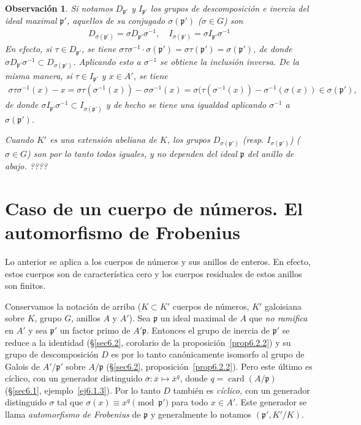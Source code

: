 \documentclass[10pt,oneside,bibtotoc,smallheadings,leqno,a5paper,DIV=12]{scrbook}
\newcommand{\idl}[1]{\mathfrak{#1}}
\newcommand{\oline}[1]{\overline{#1}}
\DeclareMathOperator{\card}{card}
\numberwithin{equation}{section}
\theoremstyle{defi}
\theoremstyle{enonce}
\theoremstyle{rem}
\newtheorem*{remark*}{Observaci\'on}
\numberwithin{theorem}{section}
\numberwithin{proposition}{section}
\numberwithin{definition}{section}
\numberwithin{lemma}{section}
\numberwithin{corollary}{section}
\numberwithin{example}{section}
\numberwithin{footnote}{section}%
\begin{document}
\begin{remark*}
Si notamos $D_{\idl{p}'}$ y $I_{\idl{p}'}$ los grupos de descomposici\'on e inercia del ideal maximal
$\idl{p}'$, aquellos de su {\em conjugado} $\sigma(\idl{p}')$ ($\sigma\in G$) son
\begin{gather}
D_{\sigma(\idl{p}')}=\sigma D_{\idl{p}'}\sigma^{-1},\quad I_{\sigma(\idl{p}')}=\sigma I_{\idl{p}'}\sigma^{-1}
\end{gather}
En efecto, si $\tau\in D_{\idl{p}'}$, se tiene $\sigma\tau\sigma^{-1}\cdot\sigma(\idl{p}')=\sigma\tau(\idl{p}')
=\sigma(\idl{p}')$, de donde $\sigma D_{\idl{p}'}\sigma^{-1}\subset D_{\sigma(\idl{p}')}$. Aplicando esto
a $\sigma^{-1}$ se obtiene la inclusi\'on inversa. De la misma manera, si $\tau\in I_{\idl{p}'}$ y $x\in A'$,
se tiene
\begin{gather*}
\sigma\tau\sigma^{-1}(x) - x = \sigma\tau(\sigma^{-1}(x))-\sigma\sigma^{-1}(x)=\sigma(\tau(\sigma^{-1}(x))
-\sigma^{-1}(\sigma(x))\in\sigma(\idl{p}'),
\end{gather*}
de donde $\sigma I_{\idl{p}'}\sigma^{-1}\subset I_{\sigma(\idl{p}')}$ y de hecho se tiene una igualdad
aplicando $\sigma^{-1}$ a $\sigma(\idl{p}')$.

Cuando $K'$ es una extensi\'on {\em abeliana} de $K$, los grupos $D_{\sigma(\idl{p}')}$ (resp.
$I_{\sigma(\idl{p}')}$) ($\sigma\in G$) son por lo tanto todos {\em iguales,} y no dependen del ideal
$\idl{p}$ del anillo de abajo. ????
\end{remark*}

\section{Caso de un cuerpo de n\'umeros. El automorfismo de Frobenius}\label{sec6.3}

Lo anterior se aplica a los cuerpos de n\'umeros y sus anillos de enteros. En efecto, estos cuerpos son de
caracter\'istica cero y los cuerpos residuales de estos anillos son finitos.

Conservamos la notaci\'on de arriba ($K\subset K'$ cuerpos de n\'umeros, $K'$ galoisiana sobre $K$, grupo $G$,
anillos $A$ y $A'$). Sea $\idl{p}$ un ideal maximal de $A$ que {\em no ramifica} en $A'$ y sea $\idl{p}'$ un
factor primo de $A'\idl{p}$. Entonces el grupo de inercia de $\idl{p}'$ se reduce a la identidad
(\S\ref{sec6.2}, corolario de la proposici\'on~\ref{prop6.2.2})
y su grupo de descomposici\'on $D$ es por lo tanto can\'onicamente isomorfo al
grupo de Galois de $A'/\idl{p}'$ sobre $A/\idl{p}$ (\S\ref{sec6.2}, proposici\'on~\ref{prop6.2.2}).
Pero este \'ultimo es c\'iclico, con un
generador distinguido $\oline\sigma:\oline x\mapsto\oline x^{q}$, donde $q = \card(A/\idl{p})$
(\S\ref{sec6.1}, ejemplo~\ref{ej6.1.3}). Por lo tanto $D$ tambi\'en es {\em c\'iclico,} con un generador distinguido $\sigma$ tal
que $\sigma(x) \equiv x^{q}\pmod{\idl{p}'}$ para todo $x\in A'$. Este generador se llama {\em automorfismo de
Frobenius} de $\idl{p}$ y generalmente lo notamos $(\idl{p}',K'/K)$.
\end{document}
